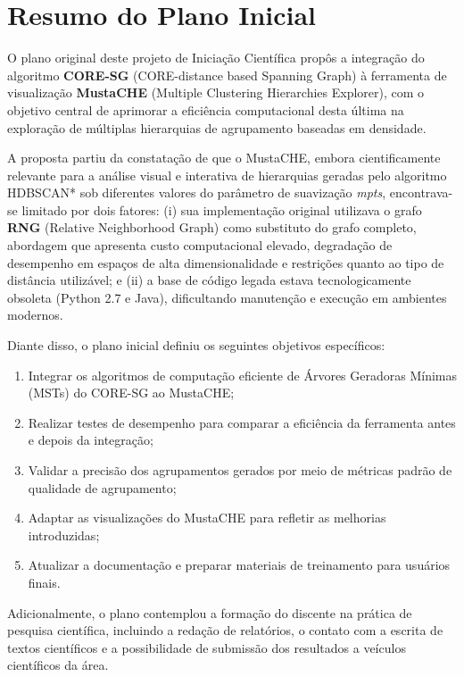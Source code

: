 \documentclass[12pt,a4paper,oneside]{article}
\begin{document}
\section{Resumo do Plano Inicial}

O plano original deste projeto de Iniciação Científica propôs a integração do algoritmo
\textbf{CORE-SG} (CORE-distance based Spanning Graph) à ferramenta de visualização
\textbf{MustaCHE} (Multiple Clustering Hierarchies Explorer), com o objetivo central de
aprimorar a eficiência computacional desta última na exploração de múltiplas hierarquias de
agrupamento baseadas em densidade.

A proposta partiu da constatação de que o MustaCHE, embora cientificamente relevante para a
análise visual e interativa de hierarquias geradas pelo algoritmo HDBSCAN* sob diferentes
valores do parâmetro de suavização \textit{mpts}, encontrava-se limitado por dois fatores: (i)
sua implementação original utilizava o grafo \textbf{RNG} (Relative Neighborhood Graph) como
substituto do grafo completo, abordagem que apresenta custo computacional elevado, degradação
de desempenho em espaços de alta dimensionalidade e restrições quanto ao tipo de distância
utilizável; e (ii) a base de código legada estava tecnologicamente obsoleta (Python 2.7 e
Java), dificultando manutenção e execução em ambientes modernos.

Diante disso, o plano inicial definiu os seguintes objetivos específicos:

\begin{enumerate}
  \item Integrar os algoritmos de computação eficiente de Árvores Geradoras Mínimas (MSTs) do
        CORE-SG ao MustaCHE;
  \item Realizar testes de desempenho para comparar a eficiência da ferramenta antes e depois
        da integração;
  \item Validar a precisão dos agrupamentos gerados por meio de métricas padrão de qualidade
        de agrupamento;
  \item Adaptar as visualizações do MustaCHE para refletir as melhorias introduzidas;
  \item Atualizar a documentação e preparar materiais de treinamento para usuários finais.
\end{enumerate}

Adicionalmente, o plano contemplou a formação do discente na prática de pesquisa científica,
incluindo a redação de relatórios, o contato com a escrita de textos científicos e a
possibilidade de submissão dos resultados a veículos científicos da área.
\end{document}
